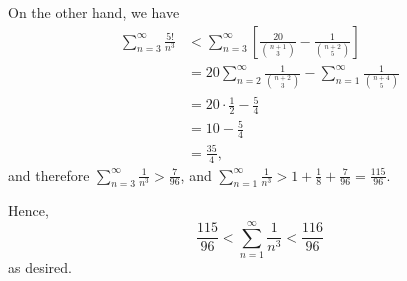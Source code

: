 \begin{enumerate}
          On the other hand, we have
          \begin{align*}
              \sum_{n = 3}^{\infty} \frac{5!}{n^3} & < \sum_{n = 3}^{\infty} \left[\frac{20}{\binom{n+1}{3}} - \frac{1}{\binom{n+2}{5}}\right]            \\
                                                   & = 20 \sum_{n = 2}^{\infty} \frac{1}{\binom{n+2}{3}} - \sum_{n = 1}^{\infty} \frac{1}{\binom{n+4}{5}} \\
                                                   & = 20 \cdot \frac{1}{2} - \frac{5}{4}                                                                 \\
                                                   & = 10 - \frac{5}{4}                                                                                   \\
                                                   & = \frac{35}{4},
          \end{align*}
          and therefore \(\sum_{n = 3}^{\infty} \frac{1}{n^3} > \frac{7}{96}\), and \(\sum_{n = 1}^{\infty} \frac{1}{n^3} > 1 + \frac{1}{8} + \frac{7}{96} = \frac{115}{96}\).

          Hence,
          \[
              \frac{115}{96} < \sum_{n = 1}^{\infty} \frac{1}{n^3} < \frac{116}{96}
          \]
          as desired.
\end{enumerate}